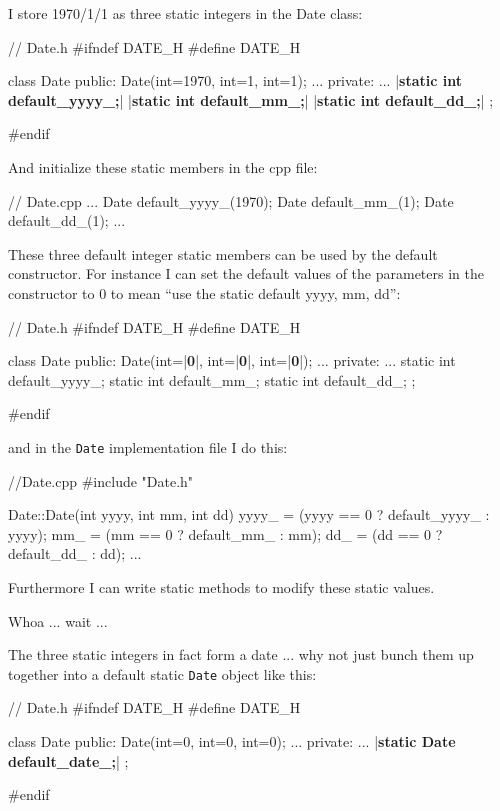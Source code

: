 I store 1970/1/1 as three static integers in the Date class:

\begin{consolethree}[escapeinside=||]
// Date.h
#ifndef DATE_H
#define DATE_H

class Date
{
public:
    Date(int=1970, int=1, int=1);
    ...
private:
    ...
    |{\bf static int default\_yyyy\_;}|
    |{\bf static int default\_mm\_;}|
    |{\bf static int default\_dd\_;}|
};

#endif
\end{consolethree}

And initialize these static members in the cpp file:

\begin{consolethree}[escapeinside=||]
// Date.cpp
...
Date default_yyyy_(1970);
Date default_mm_(1);
Date default_dd_(1);
...
\end{consolethree}

These three default integer static members can be used by the default
constructor. For instance I can set the default values of the parameters
in the constructor to 0 to mean ``use the static default yyyy, mm, dd'':

\begin{consolethree}[escapeinside=||]
// Date.h
#ifndef DATE_H
#define DATE_H

class Date
{
public:
    Date(int=|{\bf 0}|, int=|{\bf 0}|, int=|{\bf 0}|);
    ...
private:
    ...
    static int default_yyyy_;
    static int default_mm_;
    static int default_dd_;
};

#endif
\end{consolethree}

and in the \texttt{Date} implementation file I do this:

\begin{consolethree}[escapeinside=||]
//Date.cpp
#include "Date.h"

Date::Date(int yyyy, int mm, int dd)
{
    yyyy_ = (yyyy == 0 ? default_yyyy_ : yyyy);
    mm_ = (mm == 0 ? default_mm_ : mm);
    dd_ = (dd == 0 ? default_dd_ : dd);
}
...
\end{consolethree}

Furthermore I can write static methods to modify these static values.

Whoa ... wait ...

The three static integers in fact form a date ... why not just
bunch them up together into a default static \texttt{Date} object like
this:

\begin{consolethree}[escapeinside=||]
// Date.h
#ifndef DATE_H
#define DATE_H

class Date
{
public:
    Date(int=0, int=0, int=0);
    ...
private:
    ...
    |{\bf static Date default\_date\_;}|
};

#endif
\end{consolethree}

